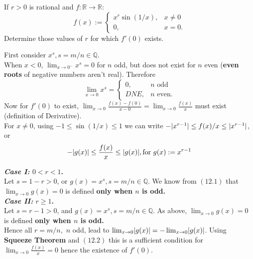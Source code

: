 \documentclass[boxes, qed]{homework}
\DeclarePairedDelimiter\abs{\lvert}{\rvert}
\begin{document}
\newenvironment{amatrix}[1]{%
  \left[\begin{array}{@{}*{#1}{c}|c@{}}
}{%
  \end{array}\right]
}

\newenvironment{augmatrix}[1]{%
  \left[\begin{array}{#1}
}{%
  \end{array}\right]
}
\begin{problem}If $r>0$ is rational and $f:\mathbb{R} \to \mathbb{R}$:
  $$f(x):= \begin{cases}
    x^r\sin(1/x), & x\ne{0}\\
    0, & x=0.
  \end{cases}
  $$
  Determine those values of $r$ for which $f'(0)$ exists.
\end{problem}
\begin{solution}First consider $x^s, s=m/n \in \mathbb{Q}$.\\
  When $x<0$, $\lim_{x\to{0^{-}}}x^s=0$
  for $n$ odd, but does not exist for $n$ even
  (\textbf{even roots} of negative numbers aren't real).
  Therefore
  \begin{equation}
    \displaystyle{\lim_{x\to{0}}x^s}=
    \begin{cases}
      0, & n \text{ odd}\\
      DNE, & n \text{ even.}
    \end{cases}
  \end{equation}
  Now for $f'(0)$ to exist,
  $
    \lim_{x\to{0}}\frac{f(x)-f(0)}{x-0}
    =\lim_{x\to{0}}\frac{f(x)}{x}
  $
  must exist (definition of Derivative).\\

  For $x \ne 0$, using $-1 \le \sin(1/x) \le 1$ we can write
  $-\abs{x^{r-1}} \le f(x)/x \le \abs{x^{r-1}}$, or
  \begin{equation}
    -\abs{g(x)} \le \frac{f(x)}{x} \le \abs{g(x)}, \text{for } g(x):=x^{r-1}
  \end{equation}

  \textbf{\textit{Case I:} $0<r<1$.}\\
  Let $s=1-r>0$, or $g(x)=x^s, s=m/n \in \mathbb{Q}$.
  We know from $(12.1)$ that $\lim_{x\to{0}}g(x)=0$ 
  is defined \textbf{only when $n$ is odd.}\\

  \textbf{\textit{Case II:} $r \ge 1$.}\\
  Let $s=r-1>0$, and $g(x)=x^s, s=m/n \in \mathbb{Q}$.
  As above, $\lim_{x\to{0}}g(x)=0$ 
  is defined \textbf{only when $n$ is odd.}\\

  Hence all $r=m/n,$ $n$ odd, 
  lead to $\lim_{x\to{0}}\abs{g(x)}
    = -\lim_{x\to{0}}\abs{g(x)}$.
  Using \textbf{Squeeze Theorem} and $(12.2)$ 
  this is a sufficient condition for
  $\displaystyle{\lim_{x\to{0}}\frac{f(x)}{x}}=0$
  hence the existence of $f'(0)$.
\end{solution}
\end{document}
